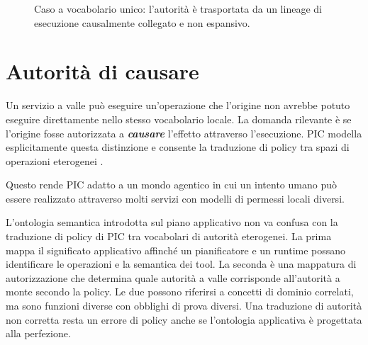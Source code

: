 \documentclass[10pt,oneside,openany]{book}
\begin{document}
\begin{figure}[ht]
\centering
{}
\caption{Caso a vocabolario unico: l'autorità è trasportata da un lineage di esecuzione causalmente collegato e non espansivo.}
\end{figure}

\section{Autorità di causare}
Un servizio a valle può eseguire un'operazione che l'origine non avrebbe potuto eseguire direttamente nello stesso vocabolario locale. La domanda rilevante è se l'origine fosse autorizzata a \textbf{\emph{causare}} l'effetto attraverso l'esecuzione. PIC modella esplicitamente questa distinzione e consente la traduzione di policy tra spazi di operazioni eterogenei \cite{gallo2026pic}.

Questo rende PIC adatto a un mondo agentico in cui un intento umano può essere realizzato attraverso molti servizi con modelli di permessi locali diversi.

L'ontologia semantica introdotta sul piano applicativo non va confusa con la traduzione di policy di PIC tra vocabolari di autorità eterogenei. La prima mappa il significato applicativo affinché un pianificatore e un runtime possano identificare le operazioni e la semantica dei tool. La seconda è una mappatura di autorizzazione che determina quale autorità a valle corrisponde all'autorità a monte secondo la policy. Le due possono riferirsi a concetti di dominio correlati, ma sono funzioni diverse con obblighi di prova diversi. Una traduzione di autorità non corretta resta un errore di policy anche se l'ontologia applicativa è progettata alla perfezione.
\end{document}
